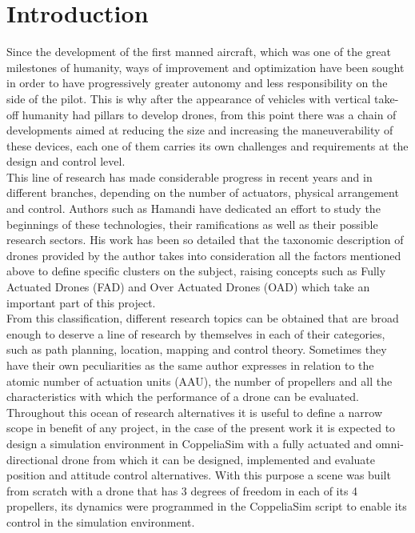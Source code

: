 \documentclass[a4paper, 12pt, oneside]{book}
\begin{document}
\chapter{Introduction}\label{int}
Since the development of the first manned aircraft, which was one of the great milestones of humanity, ways of improvement and optimization have been sought in order to have progressively greater autonomy and less responsibility on the side of the pilot. This is why after the appearance of vehicles with vertical take-off humanity had pillars to develop drones, from this point there was a chain of developments aimed at reducing the size and increasing the maneuverability of these devices, each one of them carries its own challenges and requirements at the design and control level.\\

This line of research has made considerable progress in recent years and in different branches, depending on the number of actuators, physical arrangement and control. Authors such as Hamandi \cite{hamandi2020survey} have dedicated an effort to study the beginnings of these technologies, their ramifications as well as their possible research sectors. His work has been so detailed that the taxonomic description of drones provided by the author takes into consideration all the factors mentioned above to define specific clusters on the subject, raising concepts such as Fully Actuated Drones (FAD) and Over Actuated Drones (OAD) which take an important part of this project.\\

From this classification, different research topics can be obtained that are broad enough to deserve a line of research by themselves in each of their categories, such as path planning, location, mapping and control theory. Sometimes they have their own peculiarities as the same author expresses in relation to the atomic number of  actuation units (AAU), the number of propellers and all the characteristics with which the performance of a drone can be evaluated.\\

Throughout this ocean of research alternatives it is useful to define a narrow scope in benefit of any project, in the case of the present work it is expected to design a simulation environment in CoppeliaSim with a fully actuated and omni-directional drone from which it can be designed, implemented and evaluate position and attitude control alternatives. With this purpose a scene was built from scratch with a drone that has 3 degrees of freedom in each of its 4 propellers, its dynamics were programmed in the CoppeliaSim script to enable its control in the simulation environment.\\
    
\end{document}
